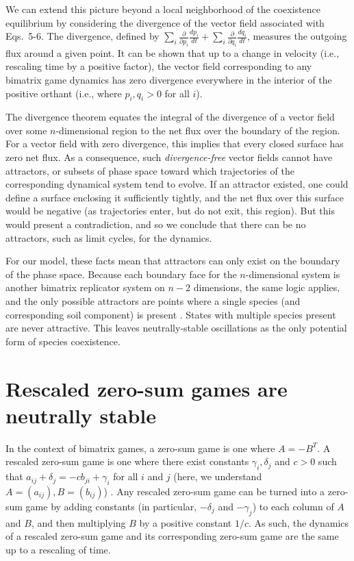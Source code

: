 \documentclass[11pt]{article}
\begin{document}
We can extend this picture beyond a local neighborhood of the coexistence equilibrium by considering the divergence of the vector field associated with Eqs.~5-6. The divergence, defined by $\sum_i \frac{\partial}{\partial p_i} \frac{dp_i}{dt} + \sum_i \frac{\partial}{\partial q_i} \frac{dq_i}{dt}$, measures the outgoing flux around a given point. It can be shown \citep[see][]{eshel1983coevolutionary, hofbauer1998evolutionary} that up to a change in velocity (i.e., rescaling time by a positive factor), the vector field corresponding to any bimatrix game dynamics has zero divergence everywhere in the interior of the positive orthant (i.e., where $p_i, q_i > 0$ for all $i$). 

The divergence theorem \citep{arfken1985mathematical} equates the integral of the divergence of a vector field over some $n$-dimensional region to the net flux over the boundary of the region. For a vector field with zero divergence, this implies that every closed surface has zero net flux. As a consequence, such \emph{divergence-free} vector fields cannot have attractors, or subsets of phase space toward which trajectories of the corresponding dynamical system tend to evolve. If an attractor existed, one could define a surface enclosing it sufficiently tightly, and the net flux over this surface would be negative (as trajectories enter, but do not exit, this region). But this would present a contradiction, and so we conclude that there can be no attractors, such as limit cycles, for the dynamics.

For our model, these facts mean that attractors can only exist on the boundary of the phase space. Because each boundary face for the $n$-dimensional system is another bimatrix replicator system on $n-2$ dimensions, the same logic applies, and the only possible attractors are points where a single species (and corresponding soil component) is present \citep{hofbauer1998evolutionary}. States with multiple species present are never attractive. This leaves neutrally-stable oscillations as the only potential form of species coexistence. 

\section{Rescaled zero-sum games are neutrally stable}

In the context of bimatrix games, a zero-sum game is one where $A = -B^T$. A rescaled zero-sum game is one where there exist constants $\gamma_i, \delta_j$ and $c > 0$ such that $a_{ij} + \delta_j = -c b_{ji} + \gamma_i$ for all $i$ and $j$ (here, we understand $A = (a_{ij}), B = (b_{ij})$) \citep{hofbauer1998evolutionary}. Any rescaled zero-sum game can be turned into a zero-sum game by adding constants (in particular, $-\delta_j$ and $-\gamma_j$) to each column of $A$ and $B$, and then multiplying $B$ by a positive constant $1 / c$. As such, the dynamics of a rescaled zero-sum game and its corresponding zero-sum game are the same up to a rescaling of time.
\end{document}
